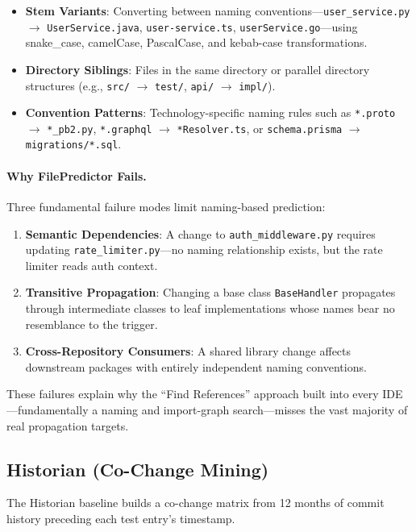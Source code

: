 \documentclass[sigconf,nonacm]{acmart}
\begin{document}
\begin{itemize}
    \item \textbf{Stem Variants}: Converting between naming conventions---\texttt{user\_service.py} $\to$ \texttt{UserService.java}, \texttt{user-service.ts}, \texttt{userService.go}---using snake\_case, camelCase, PascalCase, and kebab-case transformations.
    \item \textbf{Directory Siblings}: Files in the same directory or parallel directory structures (e.g., \texttt{src/} $\to$ \texttt{test/}, \texttt{api/} $\to$ \texttt{impl/}).
    \item \textbf{Convention Patterns}: Technology-specific naming rules such as \texttt{*.proto} $\to$ \texttt{*\_pb2.py}, \texttt{*.graphql} $\to$ \texttt{*Resolver.ts}, or \texttt{schema.prisma} $\to$ \texttt{migrations/*.sql}.
\end{itemize}

\paragraph{Why FilePredictor Fails.} Three fundamental failure modes limit naming-based prediction:
\begin{enumerate}
    \item \textbf{Semantic Dependencies}: A change to \texttt{auth\_middleware.py} requires updating \texttt{rate\_limiter.py}---no naming relationship exists, but the rate limiter reads auth context.
    \item \textbf{Transitive Propagation}: Changing a base class \texttt{BaseHandler} propagates through intermediate classes to leaf implementations whose names bear no resemblance to the trigger.
    \item \textbf{Cross-Repository Consumers}: A shared library change affects downstream packages with entirely independent naming conventions.
\end{enumerate}

These failures explain why the ``Find References'' approach built into every IDE---fundamentally a naming and import-graph search---misses the vast majority of real propagation targets.

\subsection{Historian (Co-Change Mining)}

The Historian baseline builds a co-change matrix from 12 months of commit history preceding each test entry's timestamp.
\end{document}
